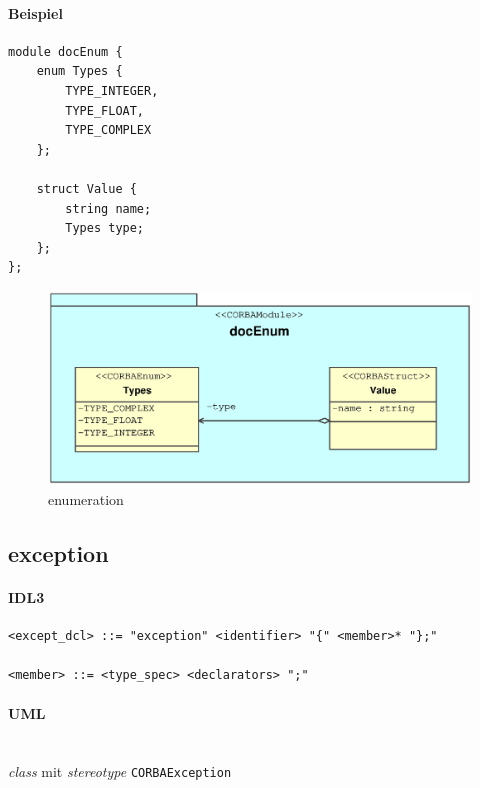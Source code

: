 \documentclass [a4paper,10pt] {scrartcl}
\begin{document}
\paragraph{Beispiel}
\begin{verbatim}
module docEnum {
    enum Types {
        TYPE_INTEGER,
        TYPE_FLOAT,
        TYPE_COMPLEX
    };

    struct Value {
        string name;
        Types type;
    };
};
\end{verbatim}
\begin{figure}[!h]
\centerline{\includegraphics[width=\linewidth]{docEnum.eps}}
\caption{enumeration}
\label{fig:enum}
\end{figure}

\cleardoublepage
\subsection{exception}
\paragraph{IDL3}
\begin{verbatim}
<except_dcl> ::= "exception" <identifier> "{" <member>* "};"

<member> ::= <type_spec> <declarators> ";"
\end{verbatim}
\paragraph{UML}~\\
\emph{class} mit \emph{stereotype} \texttt{CORBAException}\\
\end{document}
